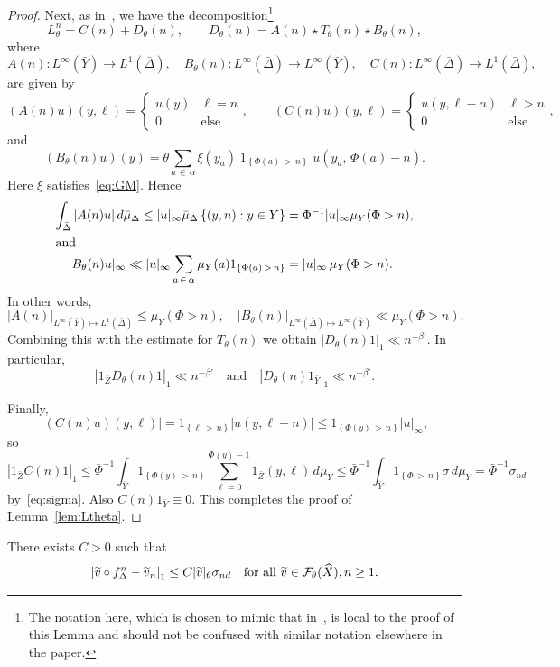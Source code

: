 \documentclass[10pt]{amsart}
\theoremstyle{definition}\newtheorem{defi}[theo]{Definition}\newtheorem{rema}[theo]{Remark}\newtheorem{exam}[theo]{Example}\newtheorem{exem}[theo]{Example}\newtheorem{nota}[theo]{Notation}
\newcommand{\cF}{\mathcal{F}}
\newcommand{\hX}{\widehat{X}}
\newcommand{\tv}{\tilde{v}}
\newcommand{\bY}{\bar{Y}}
\newcommand{\bZ}{\bar{Z}}
\newcommand{\bDelta}{\bar{\Delta}}
\newcommand{\bPhi}{\bar{\Phi}}
\let\oldtilde\tilde
\renewcommand*{\tilde}[1]{\mathchoice{\widetilde{#1}}{\widetilde{#1}}{\oldtilde{#1}}{\oldtilde{#1}}}
\begin{document}
\begin{proof}
Next, as in~\cite[Equation~(11)]{Gouezel05}, we have the decomposition\footnote{The notation here, which is chosen to mimic that in~\cite{Gouezel05}, is local to the proof of this Lemma and should not be confused with similar notation elsewhere in the paper.}
\[
L_\theta^n=C(n)+D_\theta(n), \qquad D_\theta(n)=A(n)\star T_\theta(n)\star B_\theta(n),
\]
where
\[
A(n):L^\infty(\bY)\to L^1(\bDelta), \quad B_\theta(n):L^\infty(\bDelta)\to L^\infty(\bY), \quad C(n):L^\infty(\bDelta)\to L^1(\bDelta),
\]
are given by
\[
(A(n)u)(y,\ell)=
\begin{cases} u(y) & \ell=n \\ 0 & \text{else}
\end{cases},
\qquad (C(n)u)(y,\ell)=
\begin{cases} u(y,\ell-n) & \ell>n \\ 0 & \text{else}
\end{cases},
\]
and
\[
(B_\theta(n)u)(y)=\theta\sum_{a\,\in\,\alpha}\xi(y_a)\;1_{\left\{\Phi(a)\,>\,n\right\}}\;u(y_a,\,\Phi(a)-n).
\]
Here $\xi$ satisfies~\eqref{eq:GM}. Hence
\begin{align*}
\int_{\bDelta}|A(n)u|\,d\bar\mu_\Delta \le |u|_\infty \bar\mu_\Delta \left\{(y, n):y\in Y\right\} &=\bPhi^{-1}|u|_\infty\mu_Y(\Phi>n),
\\
\intertext{and}
|B_\theta(n)u|_\infty\ll |u|_\infty\sum_{a\,\in\,\alpha}\mu_Y(a)1_{\left\{\Phi(a)\,>\,n\right\}} &=|u|_\infty\,\mu_Y(\Phi>n).
\end{align*}
In other words,
\[
|A(n)|_{L^\infty(\bY)\mapsto L^1(\bDelta)}\le \mu_Y(\Phi>n),
\quad {|B_\theta(n)|}_{L^\infty(\bDelta)\mapsto L^\infty(\bY)}\ll \mu_Y(\Phi>n).
\]
Combining this with the estimate for $T_\theta(n)$ we obtain $|D_\theta(n)1|_1\ll n^{-\beta'}$. In particular,
\[
\left|1_{\bZ} D_\theta(n)1\right|_1 \ll n^{-\beta'}
\quad\text{and}\quad |D_\theta(n)1_{\bY}|_1 \ll n^{-\beta'}.
\]

Finally,
\[
\left|(C(n)u)(y,\ell)\right|=1_{\left\{\ell\,>\,n\right\}}|u(y,\ell-n)|\le 1_{\left\{\Phi(y)\,>\,n\right\}}|u|_\infty,
\]
so
\[
\left|1_{\bZ} C(n)1\right|_1\le
\bPhi^{-1}\int_{\bY} 1_{\left\{\Phi(y)\,>\,n\right\}}\sum_{\ell=0}^{\Phi(y)-1}1_{\bZ}(y,\ell)\,d\bar\mu_Y
\le \bPhi^{-1}\int_{\bY} 1_{\left\{\Phi\,>\,n\right\}}\sigma\,d\bar\mu_Y =\bPhi^{-1}\sigma_{nd}
\]
by~\eqref{eq:sigma}. Also $C(n)1_ {\bY}\equiv0$. This completes the proof of Lemma~\ref{lem:Ltheta}.
\end{proof}

\begin{coro} \label{cor:Ltheta}
There exists $C>0$ such that
\[
\left|\tv\circ f_\Delta^n-\tv_n\right|_1\le C|\tv|_\theta\sigma_{nd}
\quad\text{for all }\tv\in\cF_\theta(\hX), n\ge1.
\]
\end{coro}
\end{document}
